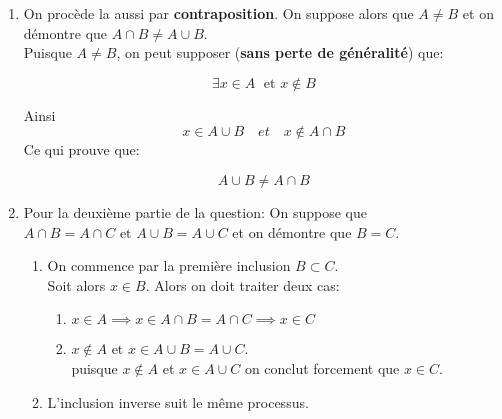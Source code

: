 \documentclass{report}
\begin{document}
\begin{myproof}
\begin{enumerate}
  \item On procède la aussi par \textbf{contraposition}. On suppose alors que
    $A\neq B$ et on démontre que $A\cap B \neq A \cup B$.\\

    Puisque $A \neq B$, on peut supposer (\textbf{sans perte de généralité}) que:

       $$
       \exists x \in A \; \text{ et } x \not\in B
       $$
  
       Ainsi 
       $$ x \in A\cup B  \quad {et} \quad x \not\in A \cap B$$
       Ce qui prouve que: 

       $$
       A\cup B \neq A \cap B
       $$
     \item Pour la deuxième partie de la question:
       On suppose que $A\cap B=A\cap C \text{ et } A\cup B=A\cup C$ et on
       démontre que $B = C$.

       \begin{enumerate}
         \item On commence par la première inclusion $ B \subset C$.\\

           Soit alors $x \in B $.
           Alors on doit traiter deux cas:

           \begin{enumerate}
           \item $x \in A \implies x \in A\cap B = A\cap C \implies x\in C$ 
           \item $x\not\in A \text{ et } x\in A\cup B = A\cup C$.\\
             puisque $x\not\in A$ et $x\in A\cup C$ on conclut forcement que $x \in C$.
           \end{enumerate}
         \item L'inclusion inverse suit le même processus.
       \end{enumerate}
\end{enumerate}
\end{myproof}
\end{document}
